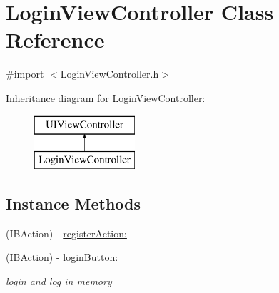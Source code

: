 \hypertarget{interface_login_view_controller}{}\section{Login\+View\+Controller Class Reference}
\label{interface_login_view_controller}


{\ttfamily \#import $<$Login\+View\+Controller.\+h$>$}

Inheritance diagram for Login\+View\+Controller\+:\begin{figure}[H]
\begin{center}
\leavevmode
\includegraphics[height=2.000000cm]{interface_login_view_controller}
\end{center}
\end{figure}
\subsection*{Instance Methods}
\begin{DoxyCompactItemize}
\item 
(I\+B\+Action) -\/ \hyperlink{interface_login_view_controller_a976155005b73eade5bc37408c243bf82}{register\+Action\+:}
\item 
(I\+B\+Action) -\/ \hyperlink{interface_login_view_controller_a2fb8213f4fc594a07c7632893bffe055}{login\+Button\+:}
\begin{DoxyCompactList}\small\item\em login and log in memory \end{DoxyCompactList}\end{DoxyCompactItemize}
